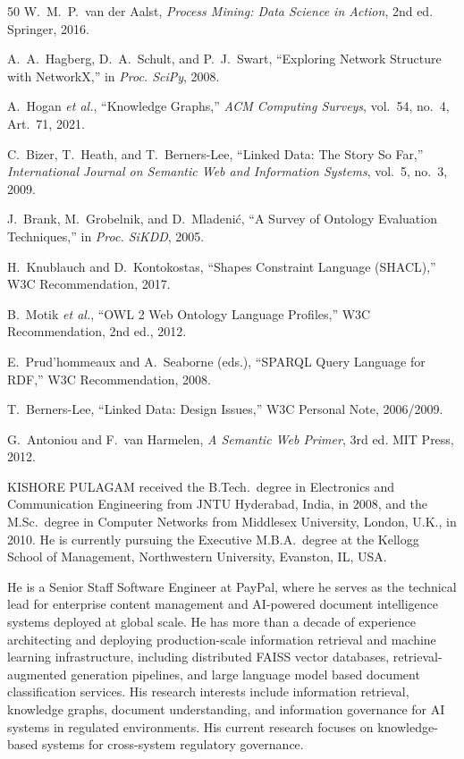\documentclass{ieeeaccess}
\begin{document}
\begin{thebibliography}{50}
W.~M.~P.~van der Aalst, \textit{Process Mining: Data Science in Action}, 2nd ed. Springer, 2016.

A.~A.~Hagberg, D.~A.~Schult, and P.~J.~Swart, ``Exploring Network Structure with NetworkX,'' in \textit{Proc. SciPy}, 2008.

A.~Hogan \textit{et al.}, ``Knowledge Graphs,'' \textit{ACM Computing Surveys}, vol.~54, no.~4, Art.~71, 2021.

C.~Bizer, T.~Heath, and T.~Berners-Lee, ``Linked Data: The Story So Far,'' \textit{International Journal on Semantic Web and Information Systems}, vol.~5, no.~3, 2009.

J.~Brank, M.~Grobelnik, and D.~Mladeni\'{c}, ``A Survey of Ontology Evaluation Techniques,'' in \textit{Proc. SiKDD}, 2005.

H.~Knublauch and D.~Kontokostas, ``Shapes Constraint Language (SHACL),'' W3C Recommendation, 2017.

B.~Motik \textit{et al.}, ``OWL 2 Web Ontology Language Profiles,'' W3C Recommendation, 2nd ed., 2012.


E.~Prud'hommeaux and A.~Seaborne (eds.), ``SPARQL Query Language for RDF,'' W3C Recommendation, 2008.

T.~Berners-Lee, ``Linked Data: Design Issues,'' W3C Personal Note, 2006/2009.

G.~Antoniou and F.~van Harmelen, \textit{A Semantic Web Primer}, 3rd ed. MIT Press, 2012.

\end{thebibliography}

\begin{IEEEbiographynophoto}{KISHORE PULAGAM}
received the B.Tech.\ degree in Electronics and Communication Engineering from JNTU Hyderabad, India, in 2008, and the M.Sc.\ degree in Computer Networks from Middlesex University, London, U.K., in 2010. He is currently pursuing the Executive M.B.A.\ degree at the Kellogg School of Management, Northwestern University, Evanston, IL, USA.

He is a Senior Staff Software Engineer at PayPal, where he serves as the technical lead for enterprise content management and AI-powered document intelligence systems deployed at global scale. He has more than a decade of experience architecting and deploying production-scale information retrieval and machine learning infrastructure, including distributed FAISS vector databases, retrieval-augmented generation pipelines, and large language model based document classification services. His research interests include information retrieval, knowledge graphs, document understanding, and information governance for AI systems in regulated environments. His current research focuses on knowledge-based systems for cross-system regulatory governance.
\end{IEEEbiographynophoto}

\EOD
\end{document}
